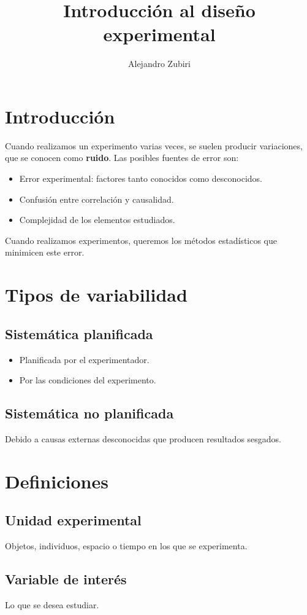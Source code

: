 \documentclass{article}
\author{Alejandro Zubiri}
\title{Introducción al diseño experimental}
\begin{document}
\maketitle
\tableofcontents
\pagebreak

\section{Introducción}
Cuando realizamos un experimento varias veces, se suelen producir variaciones, que se conocen como \textbf{ruido}.
Las posibles fuentes de error son:
\begin{itemize}
	\item Error experimental: factores tanto conocidos como desconocidos.
	\item Confusión entre correlación y causalidad.
	\item Complejidad de los elementos estudiados.
\end{itemize}
Cuando realizamos experimentos, queremos los métodos estadísticos que minimicen
este error.
\section{Tipos de variabilidad}
\subsection{Sistemática planificada}
\begin{itemize}
	\item Planificada por el experimentador.
	\item Por las condiciones del experimento.
\end{itemize}
\subsection{Sistemática no planificada}
Debido a causas externas desconocidas que producen resultados sesgados.
\section{Definiciones}
\subsection{Unidad experimental}
Objetos, individuos, espacio o tiempo en los que se experimenta.
\subsection{Variable de interés}
Lo que se desea estudiar.
\end{document}
